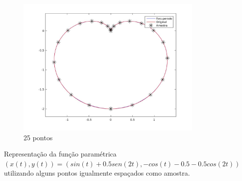 \begin{frame}
\begin{figure}
\begin{subfigure}[b]{0.31\textwidth}
		\label{fig:ex12}
	\end{subfigure}
	\hfill
	\begin{subfigure}[b]{0.31\textwidth}
		\centering
		\includegraphics[trim={5cm 2cm 3cm 2cm},clip,width=\textwidth]{imagens/rep_1_25.jpg}
		\caption{25 pontos}
		\label{fig:ex13}
	\end{subfigure}
	\caption{Representação da função paramétrica $(x(t), y(t)) = (sin(t) + 0.5 sen(2t), -cos(t) - 0.5 - 0.5 cos(2t))$ utilizando alguns pontos igualmente espaçados como amostra.}
	\label{fig:ex1rep}
\end{figure}

\end{frame}



